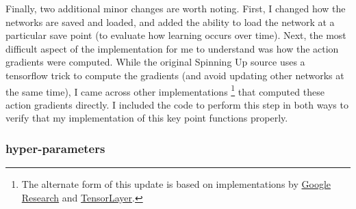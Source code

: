 \documentclass{article}
\begin{document}
Finally, two additional minor changes are worth noting. First, I changed how the networks are saved and loaded, and added the ability to load the network at a particular save point (to evaluate how learning occurs over time). Next, the most difficult aspect of the implementation for me to understand was how the action gradients were computed. While the original Spinning Up source uses a tensorflow trick to compute the gradients (and avoid updating other networks at the same time), I came across other implementations \footnote{The alternate form of this update is based on implementations by \href{https://github.com/google-research}{Google Research} and \href{https://github.com/tensorlayer/tensorlayer/}{TensorLayer}.} that computed these action gradients directly. I included the code to perform this step in both ways to verify that my implementation of this key point functions properly.


\subsubsection{hyper-parameters}\label{sec:hyperparams}
\end{document}
